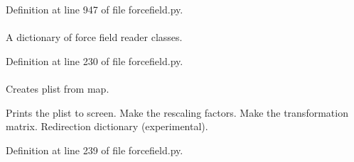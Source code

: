 \-Definition at line 947 of file forcefield.\-py.

\hypertarget{classforcebalance_1_1forcefield_1_1FF_ac9a93ef33ac311f6ce862f13a9087ba2}{
\paragraph[{\-Readers}]{}}\label{classforcebalance_1_1forcefield_1_1FF_ac9a93ef33ac311f6ce862f13a9087ba2}


\-A dictionary of force field reader classes. 



\-Definition at line 230 of file forcefield.\-py.

\hypertarget{classforcebalance_1_1forcefield_1_1FF_a5851ef86cc6b75f508ba51e13ef05bc0}{
\paragraph[{redirect}]{}}\label{classforcebalance_1_1forcefield_1_1FF_a5851ef86cc6b75f508ba51e13ef05bc0}


\-Creates plist from map. 

\-Prints the plist to screen. \-Make the rescaling factors. \-Make the transformation matrix. \-Redirection dictionary (experimental). 

\-Definition at line 239 of file forcefield.\-py.

\hypertarget{classforcebalance_1_1forcefield_1_1FF_a3424d0271d9eebf1962ad87286ec9fc3}{
\paragraph[{rs}]{}}\label{classforcebalance_1_1forcefield_1_1FF_a3424d0271d9eebf1962ad87286ec9fc3}



